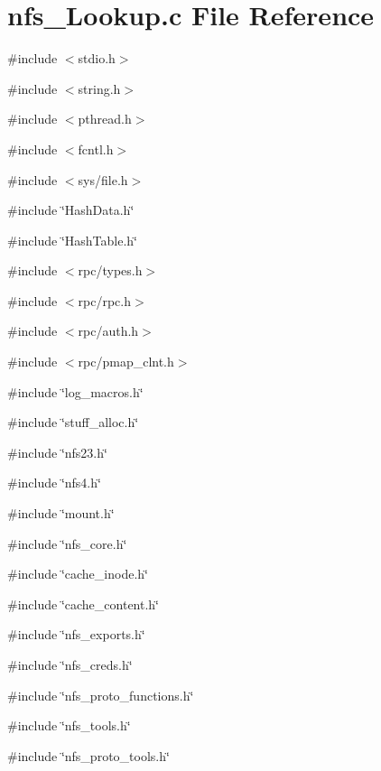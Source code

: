 \section{nfs\_\-Lookup.c File Reference}
\label{nfs__Lookup_8c}
{\ttfamily \#include $<$stdio.h$>$}\par
{\ttfamily \#include $<$string.h$>$}\par
{\ttfamily \#include $<$pthread.h$>$}\par
{\ttfamily \#include $<$fcntl.h$>$}\par
{\ttfamily \#include $<$sys/file.h$>$}\par
{\ttfamily \#include \char`\"{}HashData.h\char`\"{}}\par
{\ttfamily \#include \char`\"{}HashTable.h\char`\"{}}\par
{\ttfamily \#include $<$rpc/types.h$>$}\par
{\ttfamily \#include $<$rpc/rpc.h$>$}\par
{\ttfamily \#include $<$rpc/auth.h$>$}\par
{\ttfamily \#include $<$rpc/pmap\_\-clnt.h$>$}\par
{\ttfamily \#include \char`\"{}log\_\-macros.h\char`\"{}}\par
{\ttfamily \#include \char`\"{}stuff\_\-alloc.h\char`\"{}}\par
{\ttfamily \#include \char`\"{}nfs23.h\char`\"{}}\par
{\ttfamily \#include \char`\"{}nfs4.h\char`\"{}}\par
{\ttfamily \#include \char`\"{}mount.h\char`\"{}}\par
{\ttfamily \#include \char`\"{}nfs\_\-core.h\char`\"{}}\par
{\ttfamily \#include \char`\"{}cache\_\-inode.h\char`\"{}}\par
{\ttfamily \#include \char`\"{}cache\_\-content.h\char`\"{}}\par
{\ttfamily \#include \char`\"{}nfs\_\-exports.h\char`\"{}}\par
{\ttfamily \#include \char`\"{}nfs\_\-creds.h\char`\"{}}\par
{\ttfamily \#include \char`\"{}nfs\_\-proto\_\-functions.h\char`\"{}}\par
{\ttfamily \#include \char`\"{}nfs\_\-tools.h\char`\"{}}\par
{\ttfamily \#include \char`\"{}nfs\_\-proto\_\-tools.h\char`\"{}}\par
